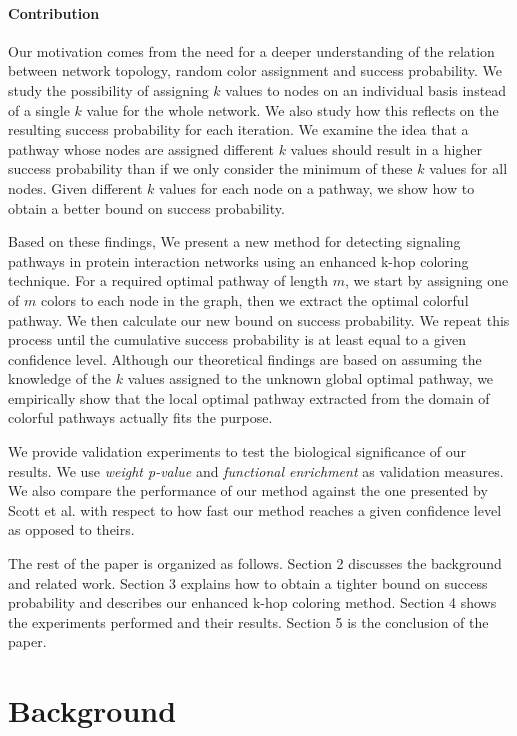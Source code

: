 \documentclass{ws-procs11x85}
\begin{document}
\paragraph{Contribution} Our motivation comes from the need for a deeper
understanding of the relation between network topology, random color assignment
and success probability. We study the possibility of assigning $k$ values to
nodes on an individual basis instead of a single $k$ value for the whole
network. We also study how this reflects on the resulting success probability
for each iteration. We examine the idea that a pathway whose nodes are assigned
different $k$ values should result in a higher success probability than if we
only consider the minimum of these $k$ values for all nodes. Given different
$k$ values for each node on a pathway, we show how to obtain a better bound on
success probability.



Based on these findings, We present a new method for detecting signaling
pathways in protein interaction networks using an enhanced k-hop coloring
technique. For a required optimal pathway of length $m$, we start by assigning
one of $m$ colors to each node in the graph, then we extract the optimal
colorful pathway. We then calculate our new bound on success probability. We
repeat this process until the cumulative success probability is at least equal
to a given confidence level. Although our theoretical findings are based on
assuming the knowledge of the $k$ values assigned to the unknown global optimal
pathway, we empirically show that the local optimal pathway extracted from the
domain of colorful pathways actually fits the purpose.

We provide validation experiments to test the biological significance of our
results. We use \textit{weight p-value} and \textit{functional enrichment} as
validation measures. We also compare the performance of our method against the
one presented by Scott et al.\cite{scott} with respect to how fast our method
reaches a given confidence level as opposed to theirs.

The rest of the paper is organized as follows. Section 2 discusses the
background and related work. Section 3 explains how to obtain a tighter bound on
success probability and describes our enhanced k-hop coloring method. Section 4
shows the experiments performed and their results. Section 5 is the conclusion
of the paper.


\section{Background}
\end{document}
